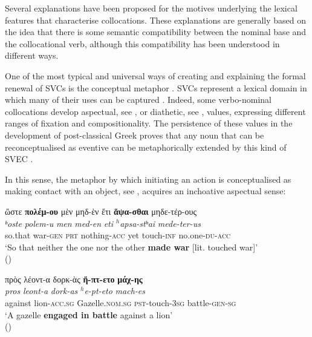 \documentclass[output=paper,colorlinks,citecolor=brown]{langscibook}
\begin{document}
Several explanations have been proposed for the motives underlying the lexical features
that characterise collocations. These explanations are generally based on the idea that
there is some semantic compatibility between the nominal base and the collocational verb,
although this compatibility has been understood in different ways.

One of the most typical and universal ways of creating and explaining the formal renewal
of SVCs is the conceptual metaphor \parencite{LakoffGeorge&JohnsonMark-1980803}. SVCs
represent a lexical domain in which many of their uses can be captured
\parencites{SalasJiménezG-2022210,SalasJiménezGuillermo-2024641}. Indeed, some
verbo-nominal collocations develop aspectual, see , or diathetic, see ,
values, expressing different ranges of fixation and compositionality. The persistence of
these values in the development of post-classical Greek proves that any noun that can be
reconceptualised as eventive can be metaphorically extended by this kind of SVEC
\parencites{FedrianiChiara-2016339,TurCristina-2020406}.

In this sense, the metaphor by which initiating an action is conceptualised as making
contact with an object, see , acquires an inchoative aspectual sense:


\ea\label{ex:vc:7}

\ea\label{ex:vc:7a}

\glll ὥστε \textbf{πολέμ-ου} μὲν μηδ-ὲν ἔτι \textbf{ἅψα-σθαι} μηδε-τέρ-ους\\
 \textit{ʰoste} \textit{polem-u} \textit{men} \textit{med-en} \textit{eti} \textit{$^h$apsa-stʰai}
\textit{mede-ter-us}\\
so.that war-\textsc{gen} \textsc{prt} nothing-\textsc{acc} yet touch-\textsc{inf}
no.one-\textsc{du-acc}\\
\glt `So that neither the one nor the other \textbf{made war} {[}lit. touched war{]}' \\
\hspace*{\fill}()

\ex\label{ex:vc:7b}

\glll πρὸς λέοντ-α δορκ-ὰς \textbf{ἥ-πτ-ετο} \textbf{μάχ-ης}\\
 \textit{pros} \textit{leont-a} \textit{dork-as} \textit{$^h$e-pt-eto} \textit{mach-es}\\
against lion-\textsc{acc.sg} Gazelle.\textsc{nom.sg} \textsc{pst}-touch-\textsc{3sg}
battle-\textsc{gen-sg}\\
\glt `A gazelle \textbf{engaged in battle} against a lion' \\
\hspace*{\fill}()
\end{document}

